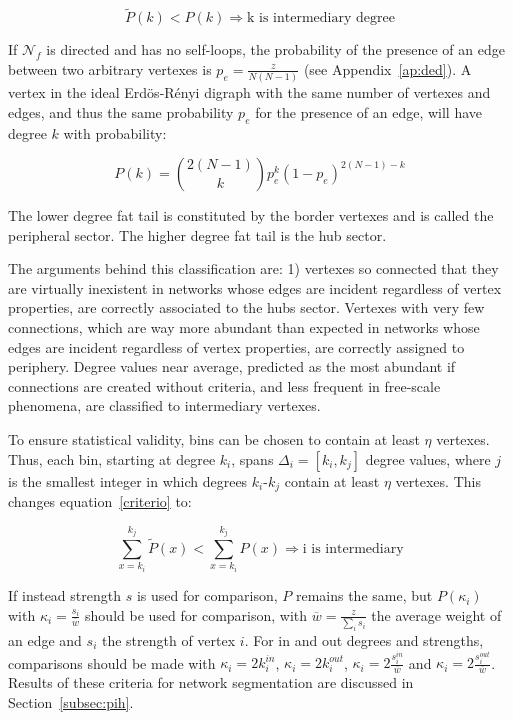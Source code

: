 \documentclass[%
 aip,
 jmp,%
 amsmath,amssymb,
 reprint,%
]{revtex4-1}
\begin{document}
\begin{equation}\label{criterio}
    \widetilde{P}(k)<P(k) \Rightarrow \text{k is intermediary degree}
\end{equation}

If $\mathcal{N}_f$ is directed and has no self-loops, the probability
of the presence of an edge between two arbitrary vertexes is $p_e=\frac{z}{N(N-1)}$ (see Appendix~\ref{ap:ded}).
A vertex in the ideal Erd\"os-R\'enyi digraph with the same number of vertexes and edges, and thus the same probability $p_e$ for the presence of an edge, will have degree $k$ with probability:

\begin{equation}
    P(k)=\binom{2(N-1)}{k}p_e^k(1-p_e)^{2(N-1)-k}
\end{equation}

The lower degree fat tail is constituted by the border
vertexes and is called the peripheral sector. 
The higher degree fat tail is the hub sector.

The arguments behind this classification are: 1) vertexes so connected that they are virtually inexistent in networks whose edges are incident regardless of vertex properties, are correctly associated to the hubs sector. Vertexes with very few connections, which are way more abundant than expected in networks whose edges are incident regardless of vertex properties, are correctly assigned to periphery. Degree values near average, predicted as the most abundant if connections are created without criteria, and less frequent in free-scale phenomena, are classified to intermediary vertexes.

To ensure statistical validity, bins can be chosen to contain at least $\eta$ vertexes. Thus, each bin, starting at degree $k_i$, spans $\Delta_i=[k_{i},k_{j}]$ degree values, where $j$ is the smallest integer in which degrees $k_i$-$k_{j}$ contain at least $\eta$ vertexes. This changes equation~\ref{criterio} to:

\begin{equation}\label{criterio2}
    \sum_{x=k_i}^{k_j} \widetilde{P}(x) < \sum_{x=k_i}^{k_j} P(x) \Rightarrow \text{i is intermediary}
\end{equation}

If instead strength $s$ is used for comparison, $P$ remains the same, but $P(\kappa_i)$ with $\kappa_i=\frac{s_i}{\overline{w}}$ should be used for comparison, with $\overline{w}=\frac{z}{\sum_is_i}$ the average weight of an edge and $s_i$ the strength of vertex $i$. For in and out degrees and strengths, comparisons should be made with $\kappa_i=2k_i^{in}$, $\kappa_i=2k_i^{out}$, $\kappa_i=2\frac{s_i^{in}}{\overline{w}}$ and $\kappa_i=2\frac{s_i^{out}}{\overline{w}}$. Results of these criteria for network segmentation are discussed in Section~\ref{subsec:pih}.
\end{document}
